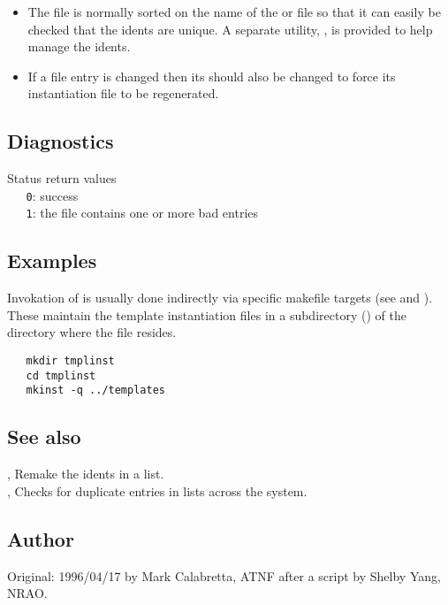 \begin{itemize}
\item
   The  file is normally sorted on the name of the 
   or  file so that it can easily be checked that the idents are
   unique.  A separate utility, , is provided to help manage
   the idents.
\item
   If a  file entry is changed then its  should
   also be changed to force its instantiation file to be regenerated.
\end{itemize}

\subsection*{Diagnostics}
 
Status return values
\\ \verb+   0+: success
\\ \verb+   1+: the  file contains one or more bad entries
 
\subsection*{Examples}
 
Invokation of  is usually done indirectly via specific makefile
targets (see  and ).  These maintain the template instantiation
files in a subdirectory () of the directory where the
 file resides. 
 
\begin{verbatim}
   mkdir tmplinst
   cd tmplinst
   mkinst -q ../templates
\end{verbatim}
 
\subsection*{See also}
 
, Remake the idents in a  list.\\
, Checks for duplicate entries in  lists
   across the system.
 
\subsection*{Author}
 
Original: 1996/04/17 by Mark Calabretta, ATNF after a  script by
Shelby Yang, NRAO.
 

